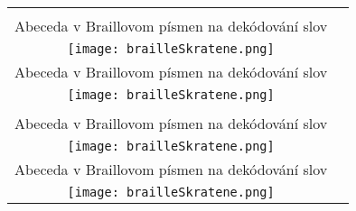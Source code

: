 \documentclass[10pt]{report}
\begin{document}
\begin{tabular}{c c}
\begin{minipage}{0.49\textwidth}
\begin{center}
\phantom{x}\\[10mm]
{\Large Abeceda v Braillovom písmen na dekódování slov}\\[1mm]
\texttt{[image: brailleSkratene.png]}
\end{center}
\end{minipage}
&
\begin{minipage}{0.49\textwidth}
\begin{center}
\phantom{x}\\[10mm]
{\Large Abeceda v Braillovom písmen na dekódování slov}\\[1mm]
\texttt{[image: brailleSkratene.png]}
\end{center}
\end{minipage}
\\
\begin{minipage}{0.49\textwidth}
\begin{center}
\phantom{x}\\[10mm]
{\Large Abeceda v Braillovom písmen na dekódování slov}\\[1mm]
\texttt{[image: brailleSkratene.png]}
\end{center}
\end{minipage}
&
\begin{minipage}{0.49\textwidth}
\begin{center}
\phantom{x}\\[10mm]
{\Large Abeceda v Braillovom písmen na dekódování slov}\\[1mm]
\texttt{[image: brailleSkratene.png]}
\end{center}
\end{minipage}

\end{tabular}
\end{document}
